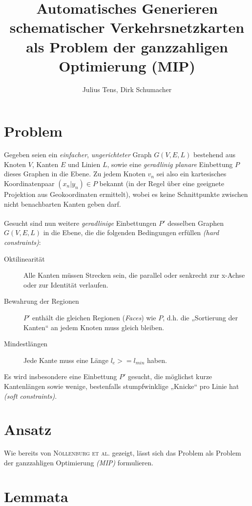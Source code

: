 \documentclass[a4paper,11pt]{amsart}
\title{Automatisches Generieren schematischer Verkehrsnetzkarten als Problem der ganzzahligen Optimierung (MIP)}
\author{Julius Tens, Dirk Schumacher}
\begin{document}
\maketitle

\section*{Problem}

\noindent Gegeben seien ein \textit{einfacher}, \textit{ungerichteter} Graph $G(V,E,L)$ bestehend aus Knoten $V$, Kanten $E$ und Linien $L$, sowie eine \textit{geradlinig planare} Einbettung $P$ dieses Graphen in die Ebene. Zu jedem Knoten $v_n$ sei also ein kartesisches Koordinatenpaar $(x_n | y_n) \in P$ bekannt (in der Regel über eine geeignete Projektion aus Geokoordinaten ermittelt), wobei es keine Schnittpunkte zwischen nicht benachbarten Kanten geben darf.
\\\\
Gesucht sind nun weitere \textit{geradlinige} Einbettungen $P'$ desselben Graphen $G(V,E,L)$ in die Ebene, die die folgenden Bedingungen erfüllen \textit{(hard constraints)}:
\bigskip

\begin{description}
\item[Oktilinearität] Alle Kanten müssen Strecken sein, die parallel oder senkrecht zur x-Achse oder zur Identität verlaufen.
\bigskip
\item[Bewahrung der Regionen] $P'$ enthält die gleichen Regionen (\textit{Faces}) wie $P$, d.h. die „Sortierung der Kanten“ an jedem Knoten muss gleich bleiben.
\bigskip
\item[Mindestlängen] Jede Kante muss eine Länge $l_e >= l_{min}$ haben.
\bigskip
\end{description}

\noindent Es wird insbesondere eine Einbettung $P'$ gesucht, die möglichst kurze Kantenlängen sowie wenige, bestenfalls stumpfwinklige „Knicke“ pro Linie hat \textit{(soft constraints)}.
\bigskip
\bigskip

\section*{Ansatz}

\noindent Wie bereits von \textsc{Nöllenburg et al.} gezeigt, lässt sich das Problem als Problem der ganzzahligen Optimierung \textit{(MIP)} formulieren.
\bigskip
\bigskip

\section*{Lemmata}
\end{document}

